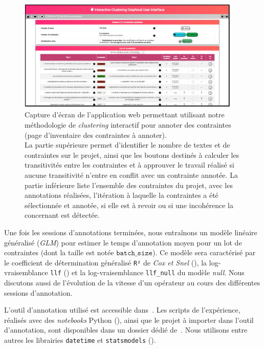 			\begin{figure}[!htb]
				\centering
				\includegraphics[width=0.95\textwidth]{figures/etude-temps-annotation-0application-liste-contraintes}
				\caption{Capture d'écran de l'application web permettant utilisant notre méthodologie de \textit{clustering} interactif pour annoter des contraintes (page d'inventaire des contraintes à annoter).\\
				La partie supérieure permet d'identifier le nombre de textes et de contraintes sur le projet, ainsi que les boutons destinés à calculer les transitivités entre les contraintes et à approuver le travail réalisé si aucune transitivité n'entre en conflit avec un contrainte annotée. La partie inférieure liste l'ensemble des contraintes du projet, avec les annotations réalisées, l'itération à laquelle la contraintes a été sélectionnée et annotée, si elle est à revoir ou si une incohérence la concernant est détectée.}
				\label{figure:4.3.1-ETUDE-COUTS-TEMPS-ANNOTATION-APPLICATION-LISTE-CONTRAINTES}
			\end{figure}
			
			
			Une fois les sessions d'annotations terminées, nous entraînons un modèle linéaire généralisé (\textit{GLM}) pour estimer le temps d'annotation moyen pour un lot de contraintes (dont la taille est notée $\texttt{batch\_size}$).
			Ce modèle sera caractérisé par le coefficient de détermination généralisé \texttt{R²} de \textit{Cox et Snel} (\cite{diamond-etal:1990:analysis-binary-data}), la log-vraisemblance \texttt{llf} (\cite{edwards:1992:likelihood}) et la log-vraisemblance \texttt{llf\_null} du modèle \textit{null}.
			Nous discutons aussi de l'évolution de la vitesse d'un opérateur au cours des différentes sessions d'annotation.

			\begin{leftBarInformation}
				L'outil d'annotation utilisé est accessible dans~\cite{schild-etal:2022:cognitivefactory-interactiveclusteringgui}.
				Les scripts de l'expérience, réalisés avec des \textit{notebooks} Python (\cite{van-rossum-drake:2009:python-reference-manual}), ainsi que le projet à importer dans l'outil d'annotation, sont disponibles dans un dossier dédié de~\cite{schild:2021:cognitivefactory-interactiveclusteringcomparativestudy}.
				Nous utilisons entre autres les librairies \texttt{datetime} et \texttt{statsmodels} (\cite{seabold-perktold:2010:statsmodels-econometric-statistical}).
			\end{leftBarInformation}

